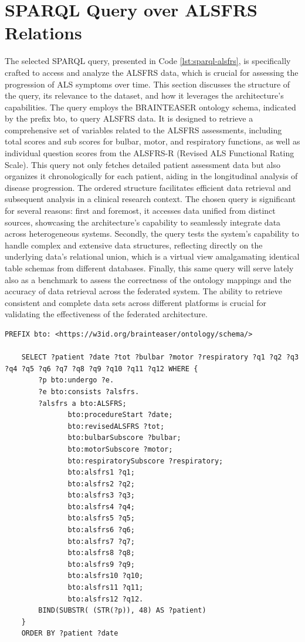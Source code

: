 \section{SPARQL Query over ALSFRS Relations}
The selected \ac{SPARQL} query, presented in Code \ref{lst:sparql-alsfrs}, is specifically crafted to access and analyze the \ac{ALSFRS} data, which is crucial for assessing the progression of \ac{ALS} symptoms over time. This section discusses the structure of the query, its relevance to the dataset, and how it leverages the architecture's capabilities. The query employs the \ac{BRAINTEASER} ontology schema, indicated by the prefix bto, to query \ac{ALSFRS} data. It is designed to retrieve a comprehensive set of variables related to the \ac{ALSFRS} assessments, including total scores and sub scores for bulbar, motor, and respiratory functions, as well as individual question scores from the \ac{ALSFRS}-R (Revised \ac{ALS} Functional Rating Scale). 
This query not only fetches detailed patient assessment data but also organizes it chronologically for each patient, aiding in the longitudinal analysis of disease progression. The ordered structure facilitates efficient data retrieval and subsequent analysis in a clinical research context.
The chosen query is significant for several reasons: first and foremost, it accesses data unified from distinct sources, showcasing the architecture's capability to seamlessly integrate data across heterogeneous systems. Secondly, the query tests the system's capability to handle complex and extensive data structures, reflecting directly on the underlying data's relational union, which is a virtual view amalgamating identical table schemas from different databases. Finally, this same query will serve lately also as a benchmark to assess the correctness of the ontology mappings and the accuracy of data retrieval across the federated system. The ability to retrieve consistent and complete data sets across different platforms is crucial for validating the effectiveness of the federated architecture.
\begin{lstlisting}[language=SPARQL, caption={\ac{SPARQL} query on \ac{ALSFRS} visits performed by patients over the \ac{BRAINTEASER} ontology vocabulary}, label={lst:sparql-alsfrs}]
    PREFIX bto: <https://w3id.org/brainteaser/ontology/schema/>
    
    SELECT ?patient ?date ?tot ?bulbar ?motor ?respiratory ?q1 ?q2 ?q3 ?q4 ?q5 ?q6 ?q7 ?q8 ?q9 ?q10 ?q11 ?q12 WHERE { 
        ?p bto:undergo ?e.
        ?e bto:consists ?alsfrs.
        ?alsfrs a bto:ALSFRS;
               bto:procedureStart ?date;
               bto:revisedALSFRS ?tot;
               bto:bulbarSubscore ?bulbar;
               bto:motorSubscore ?motor;
               bto:respiratorySubscore ?respiratory;
               bto:alsfrs1 ?q1;
               bto:alsfrs2 ?q2;
               bto:alsfrs3 ?q3;
               bto:alsfrs4 ?q4;
               bto:alsfrs5 ?q5;
               bto:alsfrs6 ?q6;
               bto:alsfrs7 ?q7;
               bto:alsfrs8 ?q8;
               bto:alsfrs9 ?q9;
               bto:alsfrs10 ?q10;
               bto:alsfrs11 ?q11;
               bto:alsfrs12 ?q12.
        BIND(SUBSTR( (STR(?p)), 48) AS ?patient)
    } 
    ORDER BY ?patient ?date
\end{lstlisting}


